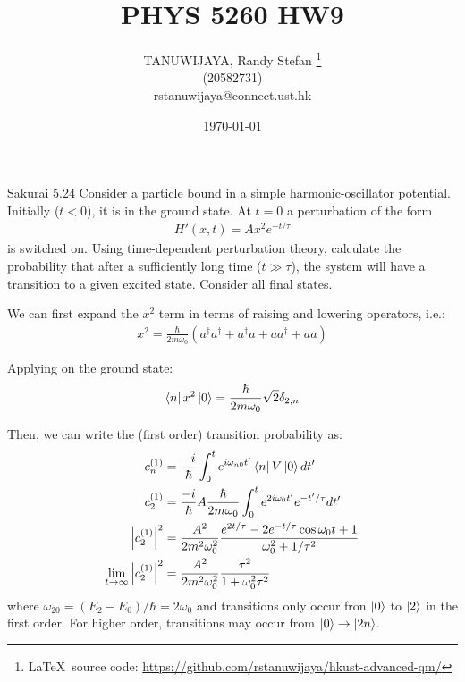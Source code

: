 \documentclass{article}
\title{PHYS 5260 HW9}
\author{TANUWIJAYA, Randy Stefan \footnote{\LaTeX\ source code: \url{https://github.com/rstanuwijaya/hkust-advanced-qm/}}
\\ (20582731) \\ rstanuwijaya@connect.ust.hk}
\affil{Department of Physics - HKUST}
\date{\today}
\begin{document}
\maketitle
\begin{section}{Sakurai 5.24}
Consider a particle bound in a simple harmonic-oscillator potential. Initially ($t < 0$), it is in the ground state. At $t=0$ a perturbation of the form
\begin{align*}
	H'(x,t) = Ax^2 e^{-t/\tau}
\end{align*}
is switched on. Using time-dependent perturbation theory, calculate the probability that after a sufficiently long time ($t \gg \tau$), the system will have a transition to a given excited state. Consider all final states.

\begin{tcolorbox}[breakable]
	We can first expand the $x^2$ term in terms of raising and lowering operators, i.e.:
	\begin{align*}
		x^2 = \frac{\hbar}{2m\omega_0} \left( a^\dagger a^\dagger + a^\dagger a + a a^\dagger + a a \right)
	\end{align*}

	Applying on the ground state:
	\begin{align*}
		\bra{n} x^2 \ket{0} = \frac{\hbar}{2m\omega_0} \sqrt{2} \delta_{2,n}
	\end{align*}

	Then, we can write the (first order) transition probability as:
	\begin{align*}
		c_n^{(1)}                                      & = \frac{-i}{\hbar} \int_0^t e^{i\omega_{n0}t'} \bra{n} V \ket{0} dt'                                       \\
		c_2^{(1)}                                      & = \frac{-i}{\hbar} A \frac{\hbar}{2m \omega_0} \int_0^t e^{2i \omega_0 t'} e^{-t'/\tau} dt'                \\
		\left| c_2^{(1)} \right|^2                     & = \frac{A^2}{2m^2 \omega_0^2} \frac{e^{2t/\tau} - 2e^{-t/\tau} \cos \omega_0 t + 1}{\omega_0^2 + 1/\tau^2} \\
		\lim_{t \to \infty} \left| c_2^{(1)} \right|^2 & = \frac{A^2}{2m^2 \omega_0^2} \frac{\tau^2}{1 + \omega_0^2 \tau^2}
	\end{align*}
	where $\omega_{20} = (E_2 - E_0)/\hbar = 2\omega_0$ and transitions only occur fron $\ket{0}$ to $\ket{2}$ in the first order. For higher order, transitions may occur from $\ket{0} \to \ket{2n}$.

\end{tcolorbox}
\end{section}
\end{document}
